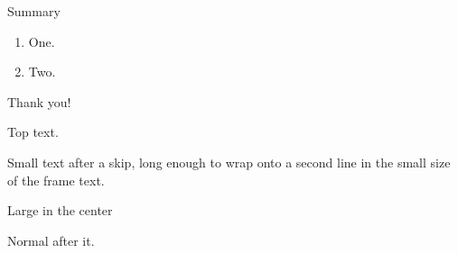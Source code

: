 \documentclass{beamer}
\begin{document}
\begin{frame}{Summary}
\begin{enumerate}
\item One.
\item Two.
\end{enumerate}
\vfill
\centering\Large Thank you!
\end{frame}
\begin{frame}
Top text.

\vspace{1cm}

\small Small text after a skip, long enough to wrap onto a second line in the small size of the frame text.
\vfill
\end{frame}
\begin{frame}
\begin{center}
\large Large in the center
\end{center}
Normal after it.
\end{frame}
\end{document}
